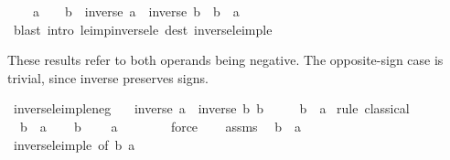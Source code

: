 \begin{isabellebody}
\ \ {\isachardoublequoteopen}{}\ {\isacharless}{\kern0pt}\ a\ {\isasymLongrightarrow}\ {}\ {\isacharless}{\kern0pt}\ b\ {\isasymLongrightarrow}\ inverse\ a\ {\isasymle}\ inverse\ b\ {\isasymlongleftrightarrow}\ b\ {\isasymle}\ a{\isachardoublequoteclose}\isanewline
%
\isadelimproof
\ \ %
\endisadelimproof
%
\isatagproof
{}\isamarkupfalse%
\ {\isacharparenleft}{\kern0pt}blast\ intro{\isacharcolon}{\kern0pt}\ le{\isacharunderscore}{\kern0pt}imp{\isacharunderscore}{\kern0pt}inverse{\isacharunderscore}{\kern0pt}le\ dest{\isacharcolon}{\kern0pt}\ inverse{\isacharunderscore}{\kern0pt}le{\isacharunderscore}{\kern0pt}imp{\isacharunderscore}{\kern0pt}le{\isacharparenright}{\kern0pt}%
\endisatagproof
{\isafoldproof}%
%
\isadelimproof
%
\endisadelimproof
%
\begin{isamarkuptext}%
These results refer to both operands being negative.  The opposite-sign
case is trivial, since inverse preserves signs.%
\end{isamarkuptext}\isamarkuptrue%
\isamarkupfalse%
\ inverse{\isacharunderscore}{\kern0pt}le{\isacharunderscore}{\kern0pt}imp{\isacharunderscore}{\kern0pt}le{\isacharunderscore}{\kern0pt}neg{\isacharcolon}{\kern0pt}\isanewline
\ \ \ {\isachardoublequoteopen}inverse\ a\ {\isasymle}\ inverse\ b{\isachardoublequoteclose}\ {\isachardoublequoteopen}b\ {\isacharless}{\kern0pt}\ {}{\isachardoublequoteclose}\isanewline
\ \ \ {\isachardoublequoteopen}b\ {\isasymle}\ a{\isachardoublequoteclose}\isanewline
%
\isadelimproof
%
\endisadelimproof
%
\isatagproof
{}\isamarkupfalse%
\ {\isacharparenleft}{\kern0pt}rule\ classical{\isacharparenright}{\kern0pt}\isanewline
\ \ \isamarkupfalse%
\ {\isachardoublequoteopen}{\isasymnot}\ b\ {\isasymle}\ a{\isachardoublequoteclose}\isanewline
\ \ \isamarkupfalse%
\ {\isacartoucheopen}b\ {\isacharless}{\kern0pt}\ {}{\isacartoucheclose}\ \isamarkupfalse%
\ {\isachardoublequoteopen}a\ {\isacharless}{\kern0pt}\ {}{\isachardoublequoteclose}\isanewline
\ \ \ \ \isamarkupfalse%
\ force\isanewline
\ \ \isamarkupfalse%
\ assms\ \isamarkupfalse%
\ {\isachardoublequoteopen}b\ {\isasymle}\ a{\isachardoublequoteclose}\isanewline
\ \ \ \ \isamarkupfalse%
\ inverse{\isacharunderscore}{\kern0pt}le{\isacharunderscore}{\kern0pt}imp{\isacharunderscore}{\kern0pt}le\ {\isacharbrackleft}{\kern0pt}of\ {\isachardoublequoteopen}{\isacharminus}{\kern0pt}b{\isachardoublequoteclose}\ {\isachardoublequoteopen}{\isacharminus}{\kern0pt}a{\isachardoublequoteclose}{\isacharbrackright}{\kern0pt}\ \isamarkupfalse%

\end{isabellebody}
